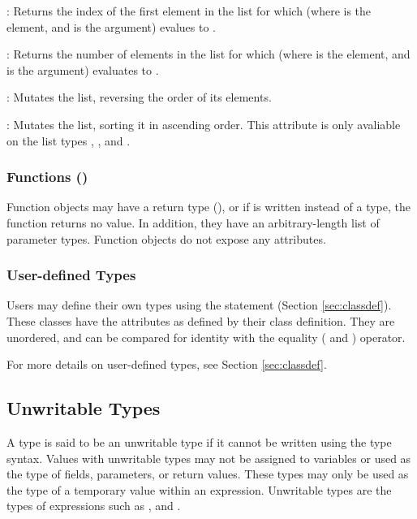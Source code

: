 : Returns the index of the first element in the list for
which  (where  is the element, and  is the
argument) evalues to .

: Returns the number of elements in the list for which
 (where  is the element, and  is the
argument) evaluates to .

: Mutates the list, reversing the order of its elements.

: Mutates the list, sorting it in ascending order. This
attribute is only avaliable on the list types \code{[int]}, \code{[float]}, and
\code{[str]}.

\subsubsection{Functions ()}

Function objects may have a return type (), or if  is written
instead of a type, the function returns no value. In addition, they have an
arbitrary-length list of parameter types. Function objects do not expose any
attributes.

\subsubsection{User-defined Types}

Users may define their own types using the  statement (Section
\ref{sec:classdef}). These classes have the attributes as defined by their class
definition. They are unordered, and can be compared for identity with the
equality (\code{==} and \code{!=}) operator.

For more details on user-defined types, see Section \ref{sec:classdef}.

\subsection{Unwritable Types}
\label{writable_types}

A type is said to be an unwritable type if it cannot be written using the type
syntax. Values with unwritable types may not be assigned to variables or used as
the type of fields, parameters, or return values. These types may only be used
as the type of a temporary value within an expression. Unwritable types are the types
of expressions such as , \code{[]} and \code{\{\}}.


